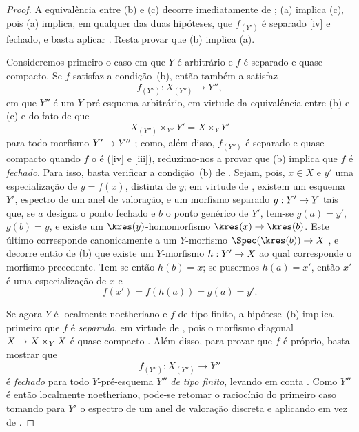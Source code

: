 \documentclass[oneside,10pt]{amsart}
\makeatletter
\newcommand{\ega@arrow}[2]{\mathchoice{#1}{#2}{#2}{#2}}
\renewcommand{\to}{\ega@arrow{\longrightarrow}{\rightarrow}}
\makeatother
\begin{document}
\begin{proof}
A equivalência entre (b) e (c) decorre imediatamente de ;
(a) implica (c), pois (a) implica, em qualquer das duas hipóteses, que $f_{(Y')}$ é separado [iv] e fechado, e basta aplicar .
Resta provar que (b) implica (a).

Consideremos primeiro o caso em que $Y$ é arbitrário e $f$ é separado e quase-compacto.
Se $f$ satisfaz a condição~(b), então também a satisfaz
\[
  f_{(Y'')}:X_{(Y'')}\longrightarrow Y'',
\]
em que $Y''$ é um $Y$-pré-esquema arbitrário, em virtude da equivalência entre (b) e (c) e do fato de que
\[
  X_{(Y'')}\times_{Y''}Y'=X\times_Y Y'
\]
para todo morfismo $Y'\to Y''$ ;
como, além disso, $f_{(Y'')}$ é separado e quase-compacto quando $f$ o é ([iv] e [iii]), reduzimo-nos a provar que (b) implica que $f$ é \emph{fechado}.
Para isso, basta verificar a condição~(b) de .
Sejam, pois, $x\in X$ e $y'$ uma especialização de $y=f(x)$, distinta de $y$;
em virtude de , existem um esquema $Y'$, espectro de um anel de valoração, e um morfismo separado $g:Y'\to Y$ tais que, se $a$ designa o ponto fechado e $b$ o ponto genérico de $Y'$, tem-se $g(a)=y'$, $g(b)=y$, e existe um $\kres(y)$-homomorfismo $\kres(x)\to\kres(b)$.
Este último corresponde canonicamente a um $Y$-morfismo $\Spec(\kres(b))\to X$ , e decorre então de (b) que existe um $Y$-morfismo $h:Y'\to X$ ao qual corresponde o morfismo precedente.
Tem-se então $h(b)=x$;
se pusermos $h(a)=x'$, então $x'$ é uma especialização de $x$ e
\[
  f(x')=f(h(a))=g(a)=y'.
\]

Se agora $Y$ é localmente noetheriano e $f$ de tipo finito, a hipótese~(b) implica primeiro que $f$ é \emph{separado}, em virtude de , pois o morfismo diagonal $X\to X\times_Y X$ é quase-compacto .
Além disso, para provar que $f$ é próprio, basta mostrar que
\[
  f_{(Y'')}:X_{(Y'')}\longrightarrow Y''
\]
é \emph{fechado} para todo $Y$-pré-esquema $Y''$ \emph{de tipo finito}, levando em conta .
Como $Y''$ é então localmente noetheriano, pode-se retomar o raciocínio do primeiro caso tomando para $Y'$ o espectro de um anel de valoração discreta e aplicando  em vez de .
\end{proof}
\end{document}
